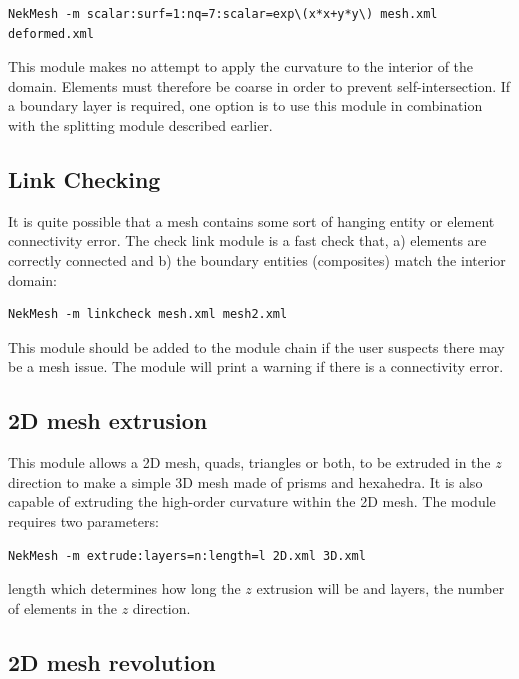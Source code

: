 \begin{lstlisting}[style=BashInputStyle]
  NekMesh -m scalar:surf=1:nq=7:scalar=exp\(x*x+y*y\) mesh.xml deformed.xml
\end{lstlisting}

\begin{notebox}
  This module makes no attempt to apply the curvature to the interior of the
  domain. Elements must therefore be coarse in order to prevent
  self-intersection. If a boundary layer is required, one option is to use this
  module in combination with the splitting module described earlier.
\end{notebox}

\subsection{Link Checking}

It is quite possible that a mesh contains some sort of hanging entity or
element connectivity error. The check link module is a fast check that, a)
elements are correctly connected and b) the boundary entities (composites)
match the interior domain:

\begin{lstlisting}[style=BashInputStyle]
  NekMesh -m linkcheck mesh.xml mesh2.xml
\end{lstlisting}

This module should be added to the module chain if the user suspects there may
be a mesh issue. The module will print a warning if there is a connectivity
error.

\subsection{2D mesh extrusion}

This module allows a 2D mesh, quads, triangles or both, to be extruded in the
$z$ direction to make a simple 3D mesh made of prisms and hexahedra. It is also
capable of extruding the high-order curvature within the 2D mesh. The module
requires two parameters:

\begin{lstlisting}[style=BashInputStyle]
  NekMesh -m extrude:layers=n:length=l 2D.xml 3D.xml
\end{lstlisting}

length which determines how long the $z$ extrusion will be and layers, the
number of elements in the $z$ direction.

\subsection{2D mesh revolution}

